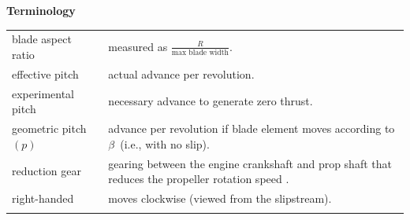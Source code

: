 \documentclass[
]{book}
\begin{document}
\textbf{Terminology}

\begin{longtable}[]{@{}ll@{}}
\toprule
\endhead
\begin{minipage}[t]{0.29\columnwidth}\raggedright
blade aspect ratio\strut
\end{minipage} & \begin{minipage}[t]{0.65\columnwidth}\raggedright
measured as \(\frac{R}{\text{max blade width}}\).\strut
\end{minipage}\tabularnewline
\begin{minipage}[t]{0.29\columnwidth}\raggedright
effective pitch\strut
\end{minipage} & \begin{minipage}[t]{0.65\columnwidth}\raggedright
actual advance per revolution.\strut
\end{minipage}\tabularnewline
\begin{minipage}[t]{0.29\columnwidth}\raggedright
experimental pitch\strut
\end{minipage} & \begin{minipage}[t]{0.65\columnwidth}\raggedright
necessary advance to generate zero thrust.\strut
\end{minipage}\tabularnewline
\begin{minipage}[t]{0.29\columnwidth}\raggedright
geometric pitch \(\left( p \right)\)\strut
\end{minipage} & \begin{minipage}[t]{0.65\columnwidth}\raggedright
advance per revolution if blade element moves according to \(\beta\)~(i.e., with no slip).\strut
\end{minipage}\tabularnewline
\begin{minipage}[t]{0.29\columnwidth}\raggedright
reduction gear\strut
\end{minipage} & \begin{minipage}[t]{0.65\columnwidth}\raggedright
gearing between the engine crankshaft and prop shaft that reduces the propeller rotation speed .\strut
\end{minipage}\tabularnewline
\begin{minipage}[t]{0.29\columnwidth}\raggedright
right-handed\strut
\end{minipage} & \begin{minipage}[t]{0.65\columnwidth}\raggedright
moves clockwise (viewed from the slipstream).\strut
\end{minipage}\tabularnewline
\begin{minipage}[t]{0.29\columnwidth}\raggedright

\end{minipage}
\end{longtable}
\end{document}
